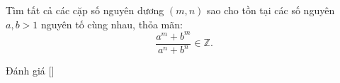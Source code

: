\ifshowproblem
\begin{problem}\label{problem:MEMO-2015-I-P4}
    Tìm tất cả các cặp số nguyên dương \( (m, n) \) sao cho tồn tại các số nguyên \( a, b > 1 \) nguyên tố cùng nhau, thỏa mãn:
    \[
        \frac{a^m + b^m}{a^n + b^n} \in \mathbb{Z}.
    \]
\end{problem}
\fi

\ifshowinfo
Đánh giá [\textbf{}]
\fi